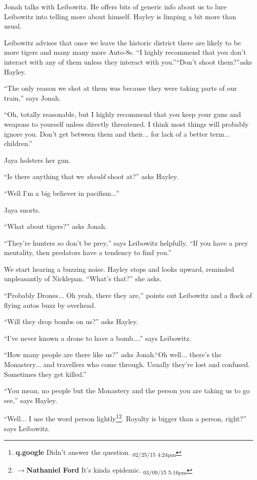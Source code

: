Jonah talks with Leibowitz.  He offers bits of generic info about us to lure Leibowitz into telling more about himself.  Hayley is limping a bit more than usual.  



Leibowitz advises that once we leave the historic district there are likely to be more tigers and many many more Auto-8s.  ``I highly recommend that you don't interact with any of them unless they interact with you.''``Don't shoot them?''asks Hayley.

``The only reason we shot at them was because they were taking parts of our train,'' says Jonah.

``Oh, totally reasonable, but I highly recommend that you keep your guns and weapons to yourself unless directly threatened.  I think most things will probably ignore you.  Don't get between them and their... for lack of a better term... children.''  

Jaya holsters her gun.

``Is there anything that we \textit{should} shoot at?'' asks Hayley.

``Well I'm a big believer in pacifism...''

Jaya snorts.

``What about tigers?'' asks Jonah.

``They're hunters so don't be prey,'' says Leibowitz helpfully.  ``If you have a prey mentality, then predators have a tendency to find you.''



We start hearing a buzzing noise.  Hayley stops and looks upward, reminded unpleasantly of Nicklepan.  ``What's that?'' she asks.

``Probably Drones... Oh yeah, there they are,'' points out Leibowitz and a flock of flying autos buzz by overhead.

``Will they drop bombs on us?'' asks Hayley.

``I've never known a drone to have a bomb....'' says Leibowitz.



``How many people are there like us?'' asks Jonah.``Oh well... there's the Monastery... and travellers who come through.  Usually they're lost and confused.  Sometimes they get killed.''

``You mean, no people but the Monastery and the person you are taking us to go see,'' says Hayley.

``Well... I use the word person lightly\footnote{\textbf{q.google }Didn't answer the question. \textsubscript{02/25/15 4:24pm}}\footnote{$\rightarrow$\textbf{Nathaniel Ford }It's kinda epidemic. \textsubscript{03/09/15 5:16pm}}.  Royalty is bigger than a person, right?'' says Leibowitz.




